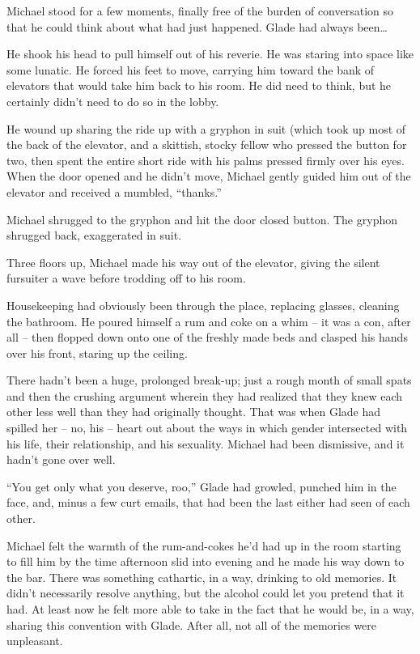 Michael stood for a few moments, finally free of the burden of conversation so that he could think about what had just happened.  Glade had always been\ldots{}

He shook his head to pull himself out of his reverie.  He was staring into space like some lunatic.  He forced his feet to move, carrying him toward the bank of elevators that would take him back to his room.  He did need to think, but he certainly didn't need to do so in the lobby.

He wound up sharing the ride up with a gryphon in suit (which took up most of the back of the elevator, and a skittish, stocky fellow who pressed the button for two, then spent the entire short ride with his palms pressed firmly over his eyes.  When the door opened and he didn't move, Michael gently guided him out of the elevator and received a mumbled, ``thanks.''

Michael shrugged to the gryphon and hit the door closed button.  The gryphon shrugged back, exaggerated in suit.

Three floors up, Michael made his way out of the elevator, giving the silent fursuiter a wave before trodding off to his room.

Housekeeping had obviously been through the place, replacing glasses, cleaning the bathroom.  He poured himself a rum and coke on a whim -- it was a con, after all -- then flopped down onto one of the freshly made beds and clasped his hands over his front, staring up the ceiling.

There hadn't been a huge, prolonged break-up; just a rough month of small spats and then the crushing argument wherein they had realized that they knew each other less well than they had originally thought.  That was when Glade had spilled her -- no, his -- heart out about the ways in which gender intersected with his life, their relationship, and his sexuality.  Michael had been dismissive, and it hadn't gone over well.

``You get only what you deserve, roo,'' Glade had growled, punched him in the face, and, minus a few curt emails, that had been the last either had seen of each other.

\secdiv

Michael felt the warmth of the rum-and-cokes he'd had up in the room starting to fill him by the time afternoon slid into evening and he made his way down to the bar. There was something cathartic, in a way, drinking to old memories.  It didn't necessarily resolve anything, but the alcohol could let you pretend that it had.  At least now he felt more able to take in the fact that he would be, in a way, sharing this convention with Glade.  After all, not all of the memories were unpleasant.

